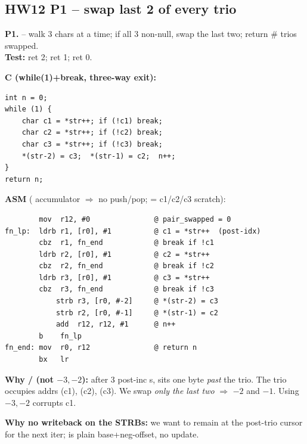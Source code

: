 \subsection{HW12 P1 -- swap last 2 of every trio}
\begin{hwp}\textbf{P1.}  -- walk 3 chars at a time; if all 3 non-null, swap the last two; return \# trios swapped.\\
\textbf{Test:}  ret 2;  ret 1;  ret 0.

\textbf{C (while(1)+break, three-way exit):}
\begin{lstlisting}
int n = 0;
while (1) {
    char c1 = *str++; if (!c1) break;
    char c2 = *str++; if (!c2) break;
    char c3 = *str++; if (!c3) break;
    *(str-2) = c3;  *(str-1) = c2;  n++;
}
return n;
\end{lstlisting}

\textbf{ASM} ( accumulator $\Rightarrow$ no push/pop;  = c1/c2/c3 scratch):
\begin{lstlisting}
        mov  r12, #0               @ pair_swapped = 0
fn_lp:  ldrb r1, [r0], #1          @ c1 = *str++  (post-idx)
        cbz  r1, fn_end            @ break if !c1
        ldrb r2, [r0], #1          @ c2 = *str++
        cbz  r2, fn_end            @ break if !c2
        ldrb r3, [r0], #1          @ c3 = *str++
        cbz  r3, fn_end            @ break if !c3
            strb r3, [r0, #-2]     @ *(str-2) = c3
            strb r2, [r0, #-1]     @ *(str-1) = c2
            add  r12, r12, #1      @ n++
        b    fn_lp
fn_end: mov  r0, r12               @ return n
        bx   lr
\end{lstlisting}

\textbf{Why \asm{[r0,\#-2]}/\asm{[r0,\#-1]} (not $-3,-2$):} after 3 post-inc s,  sits one byte \emph{past} the trio. The trio occupies addrs \asm{[r0,\#-3]} (c1), \asm{[r0,\#-2]} (c2), \asm{[r0,\#-1]} (c3). We swap \emph{only the last two} $\Rightarrow$ $-2$ and $-1$. Using $-3,-2$ corrupts c1.

\textbf{Why no \asm{!} writeback on the STRBs:} we want  to remain at the post-trio cursor for the next iter; \asm{[r0,\#-2]} is plain base+neg-offset, no update.
\end{hwp}

